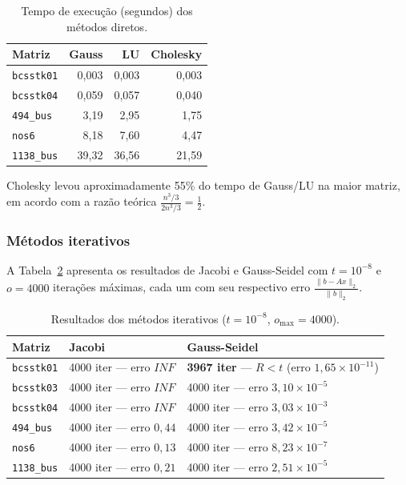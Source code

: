 \documentclass[12pt, a4paper]{article}
\begin{document}
\begin{table}[H]
  \centering
  \caption{Tempo de execução (segundos) dos métodos diretos.}
  \label{tab:diretos}
  \renewcommand{\arraystretch}{1.3}
  \begin{tabular}{lrrr}
    \toprule
    \textbf{Matriz} & \textbf{Gauss} & \textbf{LU} & \textbf{Cholesky} \\
    \midrule
    \texttt{bcsstk01}  & 0{,}003 & 0{,}003 & 0{,}003 \\
    \texttt{bcsstk04}  & 0{,}059 & 0{,}057 & 0{,}040 \\
    \texttt{494\_bus}  & 3{,}19  & 2{,}95  & 1{,}75  \\
    \texttt{nos6}      & 8{,}18  & 7{,}60  & 4{,}47  \\
    \texttt{1138\_bus} & 39{,}32 & 36{,}56 & 21{,}59 \\
    \bottomrule
  \end{tabular}
\end{table}
 
Cholesky levou aproximadamente 55\% do tempo de Gauss/LU na maior matriz, em acordo
com a razão teórica $\frac{n^3/3}{2n^3/3} = \frac{1}{2}$.
 
\subsubsection{Métodos iterativos}
 
A Tabela~\ref{tab:iterativos} apresenta os resultados de Jacobi e Gauss-Seidel com
$t = 10^{-8}$ e $o = 4000$ iterações máximas, cada um com seu respectivo erro
$\frac{\|b - Ax\|_2}{\|b\|_2}$.
 
\begin{table}[H]
  \centering
  \caption{Resultados dos métodos iterativos ($t = 10^{-8}$, $o_{\max} = 4000$).}
  \label{tab:iterativos}
  \renewcommand{\arraystretch}{1.3}
  \begin{tabular}{lll}
    \toprule
    \textbf{Matriz} & \textbf{Jacobi} & \textbf{Gauss-Seidel} \\
    \midrule
    \texttt{bcsstk01}  & 4000 iter — erro $INF$    & \textbf{3967 iter} — $R < t$ (erro $1{,}65 \times 10^{-11}$) \\
    \texttt{bcsstk03}  & 4000 iter —  erro  $INF$ & 4000 iter — erro $3{,}10 \times 10^{-5}$ \\
    \texttt{bcsstk04}  & 4000 iter — erro $INF$ & 4000 iter — erro $3{,}03 \times 10^{-3}$ \\
    \texttt{494\_bus}  & 4000 iter — erro $0{,}44$            & 4000 iter — erro $3{,}42 \times 10^{-5}$ \\
    \texttt{nos6}      & 4000 iter — erro $0{,}13$  & 4000 iter — erro $8{,}23 \times 10^{-7}$ \\
    \texttt{1138\_bus} & 4000 iter — erro $0{,}21$                 & 4000 iter — erro $2{,}51 \times 10^{-5}$ \\
    \bottomrule
  \end{tabular}
\end{table}
 
\end{document}
